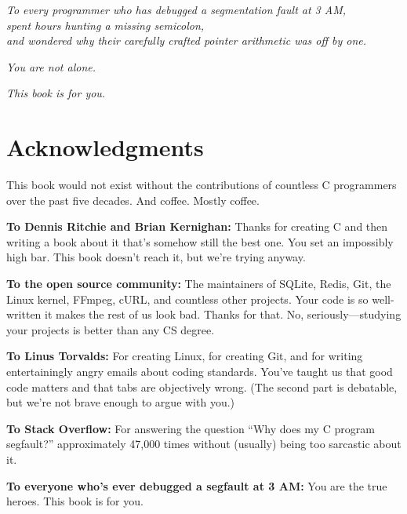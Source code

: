 \documentclass[10pt,openany]{book}
\begin{document}
\thispagestyle{empty}
\vspace*{3in}
\begin{center}
\textit{To every programmer who has debugged a segmentation fault at 3 AM,\\
spent hours hunting a missing semicolon,\\
and wondered why their carefully crafted pointer arithmetic was off by one.}

\vspace{2em}

\textit{You are not alone.}

\vspace{2em}

\textit{This book is for you.}
\end{center}
\vspace*{\fill}
\clearpage

\chapter*{Acknowledgments}

This book would not exist without the contributions of countless C programmers over the past five decades. And coffee. Mostly coffee.

\textbf{To Dennis Ritchie and Brian Kernighan:} Thanks for creating C and then writing a book about it that's somehow still the best one. You set an impossibly high bar. This book doesn't reach it, but we're trying anyway.

\textbf{To the open source community:} The maintainers of SQLite, Redis, Git, the Linux kernel, FFmpeg, cURL, and countless other projects. Your code is so well-written it makes the rest of us look bad. Thanks for that. No, seriously—studying your projects is better than any CS degree.

\textbf{To Linus Torvalds:} For creating Linux, for creating Git, and for writing entertainingly angry emails about coding standards. You've taught us that good code matters and that tabs are objectively wrong. (The second part is debatable, but we're not brave enough to argue with you.)

\textbf{To Stack Overflow:} For answering the question ``Why does my C program segfault?'' approximately 47,000 times without (usually) being too sarcastic about it.

\textbf{To everyone who's ever debugged a segfault at 3 AM:} You are the true heroes. This book is for you.
\end{document}
